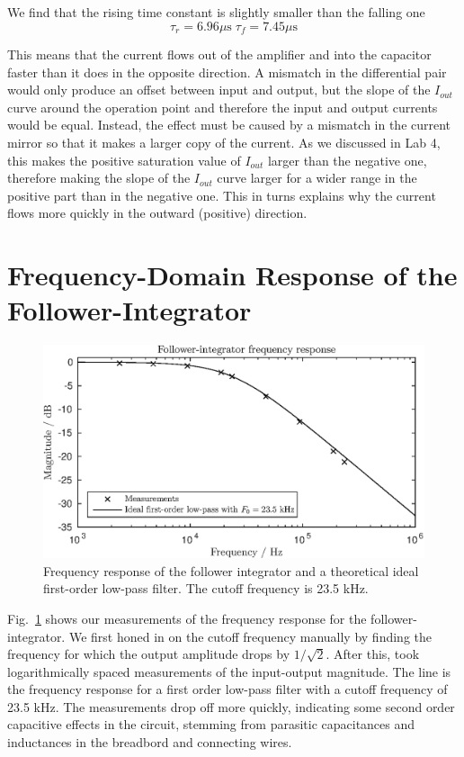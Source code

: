 We find that the rising time constant is slightly smaller than the falling one
\begin{equation*}
    \tau_r = 6.96\mu\mathrm{s} \; \tau_f = 7.45\mu\mathrm{s}
\end{equation*}

This means that the current flows out of the amplifier and into the capacitor faster than it does in the opposite direction. A mismatch in the differential pair would only produce an offset between input and output, but the slope of the \(I_{out}\) curve around the operation point and therefore the input and output currents would be equal. 
Instead, the effect must be caused by a mismatch in the current mirror so that it makes a larger copy of the current. As we discussed in Lab 4, this makes the positive saturation value of \(I_{out}\) larger than the negative one, therefore making the slope of the \(I_{out}\) curve larger for a wider range in the positive part than in the negative one. This in turns explains why the current flows more quickly in the outward (positive) direction. 


\section{Frequency-Domain Response of the Follower-Integrator}
\begin{figure}
    \center
    \includegraphics{ex3-freqresp.eps}
    \caption{Frequency response of the follower integrator and a theoretical ideal first-order low-pass filter. The cutoff frequency is 23.5 kHz.}
    \label{fig:ex3-1}
\end{figure}
Fig.~\ref{fig:ex3-1} shows our measurements of the frequency response for the follower-integrator. We first honed in on the cutoff frequency manually by finding the frequency for which the output amplitude drops by \(1/\sqrt 2\). 
After this, took logarithmically spaced measurements of the input-output magnitude. The line is the frequency response for a first order low-pass
filter with a cutoff frequency of 23.5 kHz. The measurements drop off more quickly, indicating some second order capacitive effects in the circuit,
stemming from parasitic capacitances and inductances in the breadbord and connecting wires.

